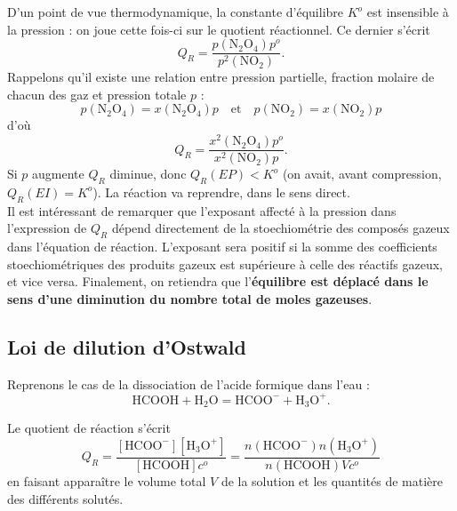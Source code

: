 \documentclass[11pt,a4paper]{report}
\begin{document}
D'un point de vue thermodynamique, la constante d'équilibre $K^o$ est insensible à la pression : on joue cette fois-ci sur le quotient réactionnel. Ce dernier s'écrit
\begin{equation}
	Q_R = \frac{p(\text{N}_2\text{O}_4)p^o}{p^2(\text{NO}_2)}.
\end{equation}
Rappelons qu'il existe une relation entre pression partielle, fraction molaire de chacun des gaz et pression totale $p$ :
\begin{equation}
	p(\text{N}_2\text{O}_4) = x(\text{N}_2\text{O}_4) p \quad\text{et}\quad p(\text{NO}_2) = x(\text{NO}_2) p
\end{equation}
d'où 
\begin{equation}
	Q_R =  \frac{x^2(\text{N}_2\text{O}_4) p^o}{x^2(\text{NO}_2) p}.
\end{equation}
Si $p$ augmente $Q_R$ diminue, donc $Q_R(EP) < K^o$ (on avait, avant compression, $Q_R(EI) = K^o$). La réaction va reprendre, dans le sens direct.\\

Il est intéressant de remarquer que l'exposant affecté à la pression dans l'expression de $Q_R$ dépend directement de la stoechiométrie des composés gazeux dans l'équation de réaction. L'exposant sera positif si la somme des coefficients stoechiométriques des produits gazeux est supérieure à celle des réactifs gazeux, et vice versa. Finalement, on retiendra que l'\textbf{équilibre est déplacé dans le sens d'une diminution du nombre total de moles gazeuses}.

\subsection{Loi de dilution d'Ostwald}

Reprenons le cas de la dissociation de l'acide formique dans l'eau :
\begin{equation}
	\text{HCOOH} + \text{H}_2\text{O} = \text{HCOO}^- + \text{H}_3\text{O}^+.
\end{equation}

Le quotient de réaction s'écrit
\begin{equation}
	Q_R = \frac{[\text{HCOO}^-][\text{H}_3\text{O}^+]}{[\text{HCOOH}]c^o} = \frac{n(\text{HCOO}^-)n(\text{H}_3\text{O}^+)}{n(\text{HCOOH})Vc^o}
\end{equation}
en faisant apparaître le volume total $V$ de la solution et les quantités de matière des différents solutés.\\
\end{document}
